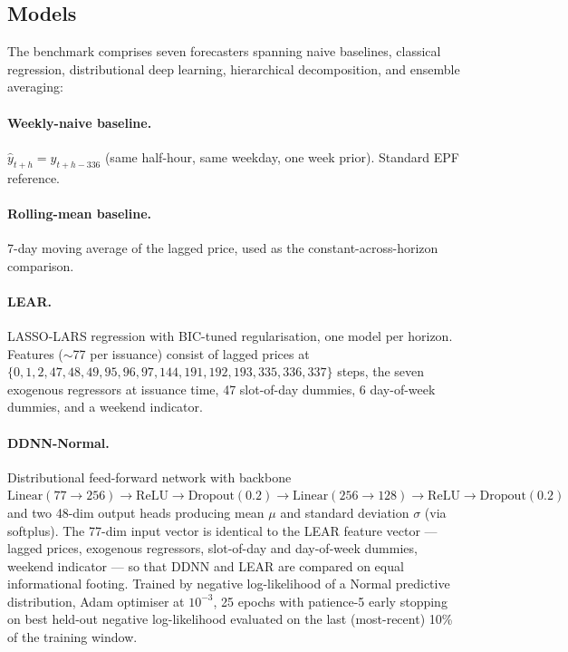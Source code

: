 \documentclass[review,3p,times,authoryear]{elsarticle}
\begin{document}
\subsection{Models}\label{sec:models}
The benchmark comprises seven forecasters spanning naive baselines, classical regression, distributional deep learning, hierarchical decomposition, and ensemble averaging:

\paragraph{Weekly-naive baseline.} \(\hat{y}_{t+h} = y_{t+h - 336}\) (same half-hour, same weekday, one week prior). Standard EPF reference.

\paragraph{Rolling-mean baseline.} 7-day moving average of the lagged price, used as the constant-across-horizon comparison.

\paragraph{LEAR.} LASSO-LARS regression with BIC-tuned regularisation, one model per horizon. Features (\(\sim\)77 per issuance) consist of lagged prices at \(\{0, 1, 2, 47, 48, 49, 95, 96, 97, 144, 191, 192, 193, 335, 336, 337\}\) steps, the seven exogenous regressors at issuance time, 47 slot-of-day dummies, 6 day-of-week dummies, and a weekend indicator.

\paragraph{DDNN-Normal.} Distributional feed-forward network with backbone \(\mathrm{Linear}(77 \to 256) \to \mathrm{ReLU} \to \mathrm{Dropout}(0.2) \to \mathrm{Linear}(256 \to 128) \to \mathrm{ReLU} \to \mathrm{Dropout}(0.2)\) and two 48-dim output heads producing mean \(\mu\) and standard deviation \(\sigma\) (via softplus). The 77-dim input vector is identical to the LEAR feature vector --- lagged prices, exogenous regressors, slot-of-day and day-of-week dummies, weekend indicator --- so that DDNN and LEAR are compared on equal informational footing. Trained by negative log-likelihood of a Normal predictive distribution, Adam optimiser at \(10^{-3}\), 25 epochs with patience-5 early stopping on best held-out negative log-likelihood evaluated on the last (most-recent) 10\% of the training window.
\end{document}
